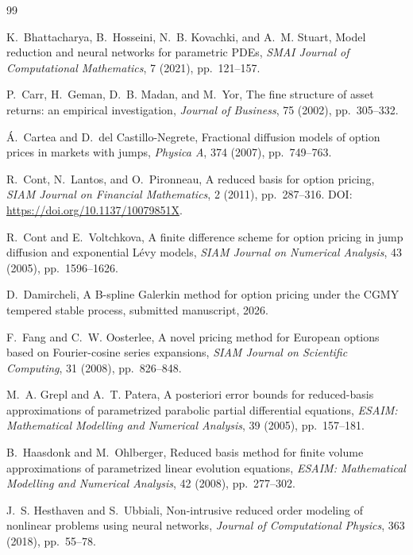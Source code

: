 \documentclass[11pt]{amsart}
\theoremstyle{remark}
\begin{document}
\begin{thebibliography}{99}

K.~Bhattacharya, B.~Hosseini, N.~B. Kovachki, and A.~M. Stuart,
\newblock Model reduction and neural networks for parametric PDEs,
\newblock \emph{SMAI Journal of Computational Mathematics}, 7 (2021),
pp.~121--157.

P.~Carr, H.~Geman, D.~B. Madan, and M.~Yor,
\newblock The fine structure of asset returns: an empirical investigation,
\newblock \emph{Journal of Business}, 75 (2002), pp.~305--332.

\'A.~Cartea and D.~del Castillo-Negrete,
\newblock Fractional diffusion models of option prices in markets with jumps,
\newblock \emph{Physica A}, 374 (2007), pp.~749--763.

R.~Cont, N.~Lantos, and O.~Pironneau,
\newblock A reduced basis for option pricing,
\newblock \emph{SIAM Journal on Financial Mathematics}, 2 (2011),
pp.~287--316. DOI: \url{https://doi.org/10.1137/10079851X}.

R.~Cont and E.~Voltchkova,
\newblock A finite difference scheme for option pricing in jump diffusion and
exponential L\'evy models,
\newblock \emph{SIAM Journal on Numerical Analysis}, 43 (2005),
pp.~1596--1626.

D.~Damircheli,
\newblock A B-spline Galerkin method for option pricing under the CGMY
tempered stable process,
\newblock submitted manuscript, 2026.

F.~Fang and C.~W. Oosterlee,
\newblock A novel pricing method for European options based on Fourier-cosine
series expansions,
\newblock \emph{SIAM Journal on Scientific Computing}, 31 (2008),
pp.~826--848.

M.~A. Grepl and A.~T. Patera,
\newblock A posteriori error bounds for reduced-basis approximations of
parametrized parabolic partial differential equations,
\newblock \emph{ESAIM: Mathematical Modelling and Numerical Analysis},
39 (2005), pp.~157--181.

B.~Haasdonk and M.~Ohlberger,
\newblock Reduced basis method for finite volume approximations of
parametrized linear evolution equations,
\newblock \emph{ESAIM: Mathematical Modelling and Numerical Analysis},
42 (2008), pp.~277--302.

J.~S. Hesthaven and S.~Ubbiali,
\newblock Non-intrusive reduced order modeling of nonlinear problems using
neural networks,
\newblock \emph{Journal of Computational Physics}, 363 (2018), pp.~55--78.


\end{thebibliography}
\end{document}
